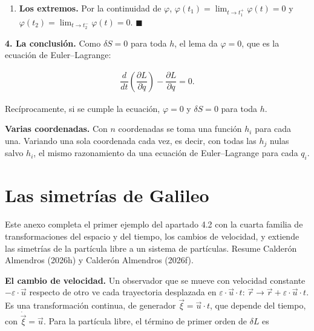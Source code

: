 \documentclass[11pt,a4paper,spanish]{book}
\begin{document}
\begin{enumerate}
  \[
  \begin{aligned}
  \int_{t_1}^{t_2} \varphi(t) \cdot h(t) \,dt = \int_\alpha^\beta \varphi(t) \cdot h(t) \,dt > 0,
  \end{aligned}
  \]

  porque es la integral de una función continua y positiva en
  \((\alpha, \beta)\). Esto contradice la hipótesis, así que
  \(\varphi(t_0) = 0\) para todo \(t_0 \in (t_1, t_2)\).
\item
  \textbf{Los extremos.} Por la continuidad de \(\varphi\),
  \(\varphi(t_1) = \lim_{t \to t_1^+} \varphi(t) = 0\) y
  \(\varphi(t_2) = \lim_{t \to t_2^-} \varphi(t) = 0\). \(\blacksquare\)
\end{enumerate}

\textbf{4. La conclusión.} Como \(\delta S = 0\) para toda \(h\), el
lema da \(\varphi = 0\), que es la ecuación de Euler--Lagrange:

\[
\begin{aligned}
\dfrac{d}{dt}\left(\dfrac{\partial L}{\partial \dot{q}}\right) - \dfrac{\partial L}{\partial q} = 0.
\end{aligned}
\]

Recíprocamente, si se cumple la ecuación, \(\varphi = 0\) y
\(\delta S = 0\) para toda \(h\).

\textbf{Varias coordenadas.} Con \(n\) coordenadas se toma una función
\(h_i\) para cada una. Variando una sola coordenada cada vez, es decir,
con todas las \(h_j\) nulas salvo \(h_i\), el mismo razonamiento da una
ecuación de Euler--Lagrange para cada \(q_i\).

\chapter{Las simetrías de Galileo}\label{las-simetruxedas-de-galileo}

Este anexo completa el primer ejemplo del apartado 4.2 con la cuarta
familia de transformaciones del espacio y del tiempo, los cambios de
velocidad, y extiende las simetrías de la partícula libre a un sistema
de partículas. Resume Calderón Almendros (2026h) y Calderón Almendros
(2026f).

\textbf{El cambio de velocidad.} Un observador que se mueve con
velocidad constante \(-\varepsilon \cdot \vec{u}\) respecto de otro ve
cada trayectoria desplazada en \(\varepsilon \cdot \vec{u} \cdot t\):
\(\vec{r} \to \vec{r} + \varepsilon \cdot \vec{u} \cdot t\). Es una
transformación continua, de generador \(\vec{\xi} = \vec{u} \cdot t\),
que depende del tiempo, con \(\dot{\vec{\xi}} = \vec{u}\). Para la
partícula libre, el término de primer orden de \(\delta L\) es
\end{document}
